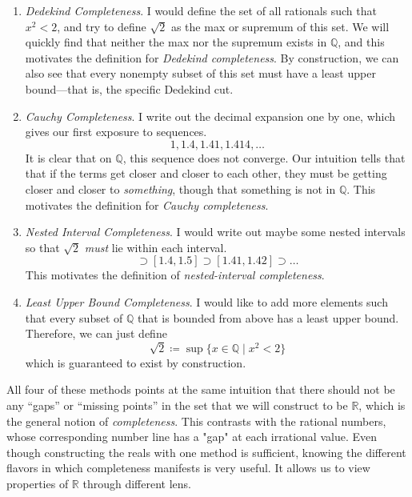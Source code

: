   \begin{enumerate}
    \item \textit{Dedekind Completeness}. I would define the set of all rationals such that $x^2 < 2$, and try to define $\sqrt{2}$ as the max or supremum of this set. We will quickly find that neither the max nor the supremum exists in $\mathbb{Q}$, and this motivates the definition for \textit{Dedekind completeness}. By construction, we can also see that every nonempty subset of this set must have a least upper bound---that is, the specific Dedekind cut.  

    \item \textit{Cauchy Completeness}. I write out the decimal expansion one by one, which gives our first exposure to sequences. 
    \begin{equation}
      1, 1.4, 1.41, 1.414, \ldots
    \end{equation} 
    It is clear that on $\mathbb{Q}$, this sequence does not converge. Our intuition tells that that if the terms get closer and closer to each other, they must be getting closer and closer to \textit{something}, though that something is not in $\mathbb{Q}$. This motivates the definition for \textit{Cauchy completeness}. 

    \item \textit{Nested Interval Completeness}. I would write out maybe some nested intervals so that $\sqrt{2}$ \textit{must} lie within each interval. 
    \begin{equation}
      [1, 2] \supset [1.4, 1.5] \supset [1.41, 1.42] \supset \ldots 
    \end{equation}
    This motivates the definition of \textit{nested-interval completeness}. 

    \item \textit{Least Upper Bound Completeness}. I would like to add more elements such that every subset of $\mathbb{Q}$ that is bounded from above has a least upper bound. Therefore, we can just define  
    \begin{equation}
      \sqrt{2} \coloneqq \sup\{x \in \mathbb{Q} \mid x^2 < 2\}
    \end{equation}
    which is guaranteed to exist by construction. 
  \end{enumerate}

  All four of these methods points at the same intuition that there should not be any ``gaps'' or ``missing points'' in the set that we will construct to be $\mathbb{R}$, which is the general notion of \textit{completeness}. This contrasts with the rational numbers, whose corresponding number line has a "gap" at each irrational value. Even though constructing the reals with one method is sufficient, knowing the different flavors in which completeness manifests is very useful. It allows us to view properties of $\mathbb{R}$ through different lens. 

